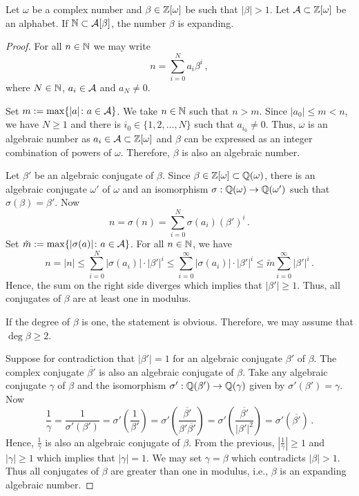 \begin{thm}
\label{thm:betaExpanding}
    Let $\omega$ be a complex number and $\beta \in\mathbb{Z}[\omega]$ be such that $|\beta|>1$. Let $\mathcal{A}\subset \mathbb{Z}[\omega]$ be an alphabet. If $\mathbb{N}\subset \mathcal{A}[\beta]$, the number $\beta$ is expanding.
\end{thm}
\begin{proof}
For all $n\in\mathbb{N}$ we may write 
    $$
    n=\sum_{i=0}^{N}a_i\beta^i\,,
    $$
    where $N\in\mathbb{N}$, $a_i\in\mathcal{A}$ and $a_N\neq 0$.
    
    Set $m:= \max\{|a|\colon a\in\mathcal{A}\}$. We take $n\in\mathbb{N}$ such that $n>m$. 
    Since $|a_0|\leq m<n$, we have  $N\geq 1$ and there is $i_0 \in \{1,2,\dots,N\}$ such that $a_{i_0}\neq 0$. Thus, $\omega$ is an algebraic number as $a_i\in\mathcal{A}\subset\mathbb{Z}[\omega]$ and $\beta$ can be expressed as an integer combination of powers of $\omega$. Therefore, $\beta$ is also an algebraic number.
    
    Let $\beta'$ be an algebraic conjugate of $\beta$.  
    Since $\beta\in\mathbb{Z}[\omega]\subset\mathbb{Q}(\omega)$, there is an algebraic conjugate $\omega'$ of $\omega$ and an isomorphism $\sigma: \mathbb{Q}(\omega)\rightarrow \mathbb{Q}(\omega')$ such that $\sigma(\beta)=\beta'$. Now 
    $$
    n=\sigma(n)=\sum_{i=0}^{N}\sigma(a_i)(\beta')^i\,.
    $$
    Set $\tilde m:= \max\{|\sigma(a)|\colon a\in\mathcal{A}\}$.  For all $n\in\mathbb{N}$, we have 
    $$
    n=|n|\leq\sum_{i=0}^{N}|\sigma(a_i)|\cdot|\beta'|^i \leq \sum_{i=0}^{\infty}|\sigma(a_i)|\cdot|\beta'|^i \leq \tilde m\sum_{i=0}^{\infty}|\beta'|^i\,.  
    $$
    Hence, the sum on the right  side diverges which implies that $|\beta'|\geq 1$. Thus, all conjugates of $\beta$ are at least one in modulus.
    
    If the degree of $\beta$ is one, the statement is obvious.  Therefore, we may assume that $\deg \beta \geq 2$. 
    
    Suppose  for contradiction that $|\beta'|=1$ for an algebraic conjugate $\beta'$  of $\beta$. The complex conjugate $\overline{\beta'}$ is also an algebraic conjugate of $\beta$. Take any algebraic conjugate $\gamma$ of $\beta$ and the isomorphism $\sigma': \mathbb{Q}(\beta')\rightarrow \mathbb{Q}(\gamma)$ given by $\sigma'(\beta')=\gamma$.
    Now
    $$
    \frac{1}{\gamma}=\frac{1}{\sigma'(\beta')}=\sigma'\left(\frac{1}{\beta'}\right)=\sigma'\left(\frac{\overline{\beta'}}{\beta'\overline{\beta'}}\right)=\sigma'\left(\frac{\overline{\beta'}}{|\beta'|^2}\right)=\sigma'(\overline{\beta'})\,.
    $$
    Hence, $\frac{1}{\gamma}$ is also an algebraic conjugate of $\beta$. From the previous, $\left|\frac{1}{\gamma}\right|\geq 1$ and $|\gamma|\geq 1$ which implies that $|\gamma|=1$. We may set $\gamma=\beta$ which contradicts $|\beta|>1$. Thus all conjugates of $\beta$ are greater than one in modulus, i.e., $\beta$ is an expanding algebraic number.
\end{proof}



